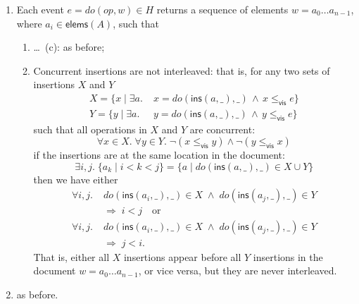 \documentclass[sigconf]{acmart}
\begin{document}
\begin{enumerate}
  \item Each event $e = \mathit{do}(\mathit{op}, w) \in H$ returns a sequence of elements $w=a_0 \dots a_{n-1}$, where $a_i \in \textsf{elems}(A)$, such that
  \begin{enumerate}
    \item \dots~(c): as before;
    \setcounter{enumii}{3}
    \item Concurrent insertions are not interleaved: that is, for any two sets of insertions $X$ and $Y$
      \begin{align*}
        X = \{x \mid \exists a.\; &x = \mathit{do}(\textsf{ins}(a, \_), \_) \,\wedge\, x \le_\textsf{vis} e\}\\
        Y = \{y \mid \exists a.\; &y = \mathit{do}(\textsf{ins}(a, \_), \_) \,\wedge\, y \le_\textsf{vis} e\}
      \end{align*}
      such that all operations in $X$ and $Y$ are concurrent:
      \[ \forall x \in X.\; \forall y \in Y.\; \neg(x \le_\textsf{vis} y) \wedge \neg(y \le_\textsf{vis} x) \]
      if the insertions are at the same location in the document:
      \[ \exists i,j.\; \{a_k \mid i < k < j\} = \{a \mid \mathit{do}(\textsf{ins}(a, \_), \_) \in X \cup Y\} \]
      then we have either
      \begin{align*}
        \forall i, j.\; & \mathit{do}(\textsf{ins}(a_i, \_), \_) \in X \;\wedge\; \mathit{do}(\textsf{ins}(a_j, \_), \_) \in Y\\
        & \Longrightarrow\; i < j \quad\text{or}\\
        \forall i, j.\; & \mathit{do}(\textsf{ins}(a_i, \_), \_) \in X \;\wedge\; \mathit{do}(\textsf{ins}(a_j, \_), \_) \in Y\\
        & \Longrightarrow\; j < i.
      \end{align*}
      That is, either all $X$ insertions appear before all $Y$ insertions in the document $w=a_0 \dots a_{n-1}$, or vice versa, but they are never interleaved.
  \end{enumerate}
  \item as before.
\end{enumerate}
\end{document}
